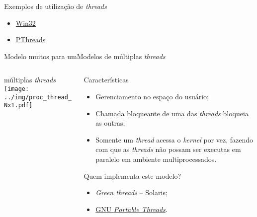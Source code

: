 \begin{frame}{Exemplos de utilização de {\em threads}}

  \begin{itemize}
  \item \href{http://adrianoholanda.org/edu/os/proc/proc_thread_win32.c}{Win32}
  \item \href{http://adrianoholanda.org/edu/os/proc/proc_thread_posix.c}{PThreads}
  \end{itemize}
  
\end{frame}





\begin{frame}{Modelo muitos para um}{Modelos de múltiplas {\em threads}}
  \begin{columns}
    \begin{column}{0.4\textwidth}
      \begin{block}{múltiplas \em threads}
        \texttt{[image: ../img/proc\_thread\_Nx1.pdf]}
      \end{block}
    \end{column}
    \begin{column}{0.6\textwidth}
      \begin{block}{Características}
        \begin{itemize}
        \item Gerenciamento no espaço do usuário;
        \item Chamada bloqueante de uma das {\em threads} bloqueia as outras;
        \item Somente um {\em thread} acessa o {\em kernel} por vez,
          fazendo com que as {\em threads} não possam ser executas em
          paralelo em ambiente multiprocessados. 
        \end{itemize}
      \end{block}
      \begin{block}{Quem implementa este modelo?}
        \begin{itemize}
        \item {\em Green threads} -- Solaris;
        \item \href{http://www.gnu.org/software/pth/}{GNU \em Portable Threads}.
        \end{itemize}
      \end{block}
    \end{column}
  \end{columns}
\end{frame}

